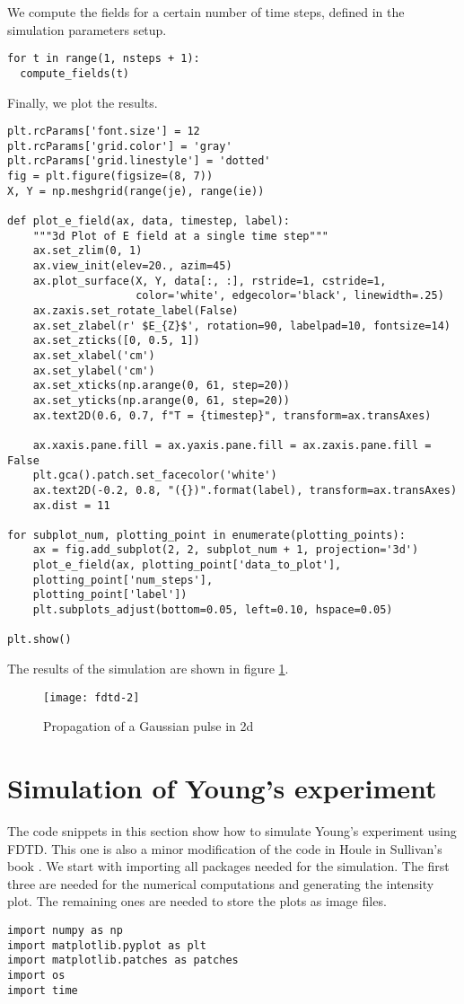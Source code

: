 \documentclass[11pt]{article}
\numberwithin{equation}{section}
\begin{document}
We compute the fields for a certain number of time steps, defined in the
simulation parameters setup.
\begin{verbatim}
for t in range(1, nsteps + 1):
  compute_fields(t)
\end{verbatim}

Finally, we plot the results.
\begin{verbatim}
plt.rcParams['font.size'] = 12
plt.rcParams['grid.color'] = 'gray'
plt.rcParams['grid.linestyle'] = 'dotted'
fig = plt.figure(figsize=(8, 7))
X, Y = np.meshgrid(range(je), range(ie))

def plot_e_field(ax, data, timestep, label):
    """3d Plot of E field at a single time step"""
    ax.set_zlim(0, 1)
    ax.view_init(elev=20., azim=45)
    ax.plot_surface(X, Y, data[:, :], rstride=1, cstride=1, 
                    color='white', edgecolor='black', linewidth=.25)
    ax.zaxis.set_rotate_label(False)
    ax.set_zlabel(r' $E_{Z}$', rotation=90, labelpad=10, fontsize=14)
    ax.set_zticks([0, 0.5, 1])
    ax.set_xlabel('cm')
    ax.set_ylabel('cm')
    ax.set_xticks(np.arange(0, 61, step=20))
    ax.set_yticks(np.arange(0, 61, step=20))
    ax.text2D(0.6, 0.7, f"T = {timestep}", transform=ax.transAxes)

    ax.xaxis.pane.fill = ax.yaxis.pane.fill = ax.zaxis.pane.fill = False
    plt.gca().patch.set_facecolor('white')
    ax.text2D(-0.2, 0.8, "({})".format(label), transform=ax.transAxes)
    ax.dist = 11

for subplot_num, plotting_point in enumerate(plotting_points):
    ax = fig.add_subplot(2, 2, subplot_num + 1, projection='3d')
    plot_e_field(ax, plotting_point['data_to_plot'],
    plotting_point['num_steps'],
    plotting_point['label'])
    plt.subplots_adjust(bottom=0.05, left=0.10, hspace=0.05)

plt.show()
\end{verbatim}
The results of the simulation are shown in figure \ref{f3}.
\begin{figure}
\centering
\texttt{[image: fdtd-2]}
\caption{Propagation of a Gaussian pulse in 2d}\label{f3}
\end{figure}

\section{Simulation of Young's experiment}\label{s9}
The code snippets in this section show how to simulate Young's experiment
using FDTD. This one is also a minor modification of the code in Houle in 
Sullivan's book \cite{sullivan2013electromagnetic}. We start with importing
all packages needed for the simulation. The first three are needed for the
numerical computations and generating the intensity plot. The remaining ones
are needed to store the plots as image files.
\begin{verbatim}
import numpy as np
import matplotlib.pyplot as plt
import matplotlib.patches as patches 
import os
import time
\end{verbatim}
\end{document}
